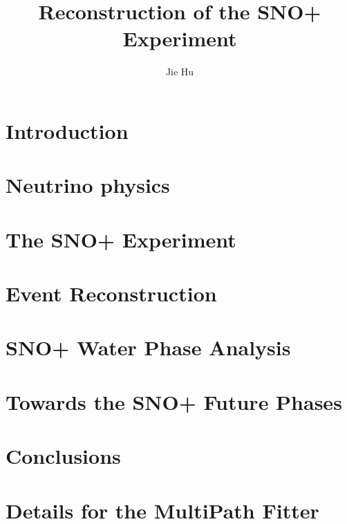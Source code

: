 \documentclass[phd,black]{PrincetonThesis}
\title{Reconstruction of the SNO+ Experiment}
\author{Jie Hu}
\begin{document}
\begin{frontmatter}
  
  \begin{thesisabstract}
    
  \end{thesisabstract}
  
  \begin{acknowledgements}
    
  \end{acknowledgements}
  
\end{frontmatter}

\cleardoublepage
\chapter{Introduction}

\chapter{Neutrino physics}

\chapter{The SNO+ Experiment}

\chapter{Event Reconstruction}

\chapter{SNO+ Water Phase Analysis}

\chapter{Towards the SNO+ Future Phases}

\chapter{Conclusions}



\appendix

\cleardoublepage
\chapter{Details for the MultiPath Fitter}
	
	
	\cleardoublepage
	\nocite{*} %
	
	
\end{document}
